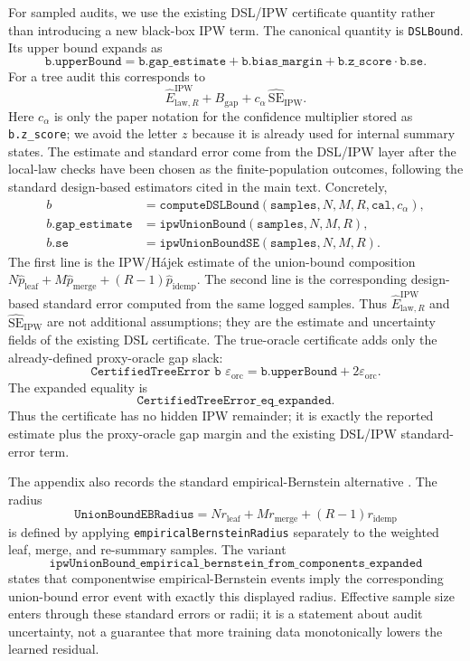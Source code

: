 For sampled audits, we use the existing DSL/IPW certificate quantity rather than
introducing a new black-box IPW term. The canonical quantity is
\texttt{DSLBound}. Its upper bound expands as
\[
  \texttt{b.upperBound}
  =
  \texttt{b.gap\_estimate}
  + \texttt{b.bias\_margin}
  + \texttt{b.z\_score}\cdot\texttt{b.se}.
\]
For a tree audit this corresponds to
\[
  \widehat E_{\mathrm{law},R}^{\mathrm{IPW}}
  + B_{\mathrm{gap}}
  + c_\alpha\,\widehat{\mathrm{SE}}_{\mathrm{IPW}}.
\]
Here \(c_\alpha\) is only the paper notation for the confidence multiplier
stored as \texttt{b.z\_score}; we avoid the letter \(z\) because it is already
used for internal summary states.
The estimate and standard error come from the DSL/IPW layer after the local-law
checks have been chosen as the finite-population outcomes, following the
standard design-based estimators cited in the main text. Concretely,
\[
\begin{aligned}
  b &= \texttt{computeDSLBound}(\texttt{samples},N,M,R,\texttt{cal},c_\alpha),
  \\
  b.\texttt{gap\_estimate} &= \texttt{ipwUnionBound}(\texttt{samples},N,M,R),
  \\
  b.\texttt{se} &= \texttt{ipwUnionBoundSE}(\texttt{samples},N,M,R).
\end{aligned}
\]
The first line is the IPW/H\'ajek estimate of the union-bound composition
\(N\widehat p_{\mathrm{leaf}}+M\widehat p_{\mathrm{merge}}
+(R-1)\widehat p_{\mathrm{idemp}}\).  The second line is the corresponding
design-based standard error computed from the same logged samples. Thus
\(\widehat E_{\mathrm{law},R}^{\mathrm{IPW}}\) and
\(\widehat{\mathrm{SE}}_{\mathrm{IPW}}\) are not additional assumptions; they
are the estimate and uncertainty fields of the existing DSL certificate.
The true-oracle certificate adds only the already-defined proxy-oracle gap slack:
\[
  \texttt{CertifiedTreeError b }\varepsilon_{\mathrm{orc}}
  =
  \texttt{b.upperBound}
  + 2\varepsilon_{\mathrm{orc}}.
\]
The expanded equality is
\[
\texttt{CertifiedTreeError\_eq\_expanded}.
\]
Thus the certificate has no hidden IPW remainder; it is exactly
the reported estimate plus the proxy-oracle gap margin and the existing DSL/IPW
standard-error term.

The appendix also records the standard empirical-Bernstein alternative
\citep{MaurerPontil2009}. The radius
\[
  \texttt{UnionBoundEBRadius}
  =
  N r_{\mathrm{leaf}} + M r_{\mathrm{merge}} + (R-1)r_{\mathrm{idemp}}
\]
is defined by applying \texttt{empiricalBernsteinRadius} separately to the
weighted leaf, merge, and re-summary samples.  The variant
\[
\texttt{ipwUnionBound\_empirical\_bernstein\_from\_components\_expanded}
\]
states that componentwise empirical-Bernstein events imply the corresponding
union-bound error event with exactly this displayed radius.  Effective sample
size enters through these standard errors or radii; it is a statement about
audit uncertainty, not a guarantee that more training data monotonically lowers
the learned residual.

